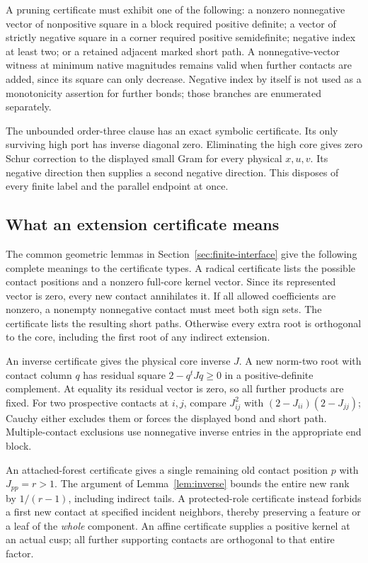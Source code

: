 \documentclass[11pt]{article}
\theoremstyle{remark}\newtheorem{remark}[theorem]{Remark}
\begin{document}
A pruning certificate must exhibit one of the following: a
nonzero nonnegative vector of nonpositive square in a block required
positive definite; a vector of strictly negative square in a corner
required positive semidefinite; negative index at least two; or a
retained adjacent marked short path. A nonnegative-vector witness
at minimum native magnitudes remains valid when further contacts
are added, since its square can only decrease. Negative index by
itself is not used as a monotonicity assertion for further bonds;
those branches are enumerated separately.

The unbounded order-three clause has an exact symbolic certificate.
Its only surviving high port has inverse diagonal zero. Eliminating
the high core gives zero Schur correction to the displayed small
Gram for every physical $x,u,v$. Its negative direction then supplies
a second negative direction. This disposes of every finite label
and the parallel endpoint at once.

\subsection{What an extension certificate means}

The common geometric lemmas in Section~\ref{sec:finite-interface}
give the following complete meanings to the certificate types.
A radical certificate lists the possible contact positions and a
nonzero full-core kernel vector. Since its represented vector is
zero, every new contact annihilates it. If all allowed coefficients
are nonzero, a nonempty nonnegative contact must meet both sign
sets. The certificate lists the resulting short paths. Otherwise
every extra root is orthogonal to the core, including the first
root of any indirect extension.

An inverse certificate gives the physical core inverse $J$.
A new norm-two root with contact column $q$ has residual square
$2-q^tJq\ge0$ in a positive-definite complement. At equality its
residual vector is zero, so all further products are fixed.
For two prospective contacts at $i,j$, compare $J_{ij}^2$ with
$(2-J_{ii})(2-J_{jj})$; Cauchy either excludes them or forces the
displayed bond and short path. Multiple-contact exclusions use
nonnegative inverse entries in the appropriate end block.

An attached-forest certificate gives a single remaining old contact
position $p$ with $J_{pp}=r>1$. The argument of
Lemma~\ref{lem:inverse} bounds the entire new rank by
$1/(r-1)$, including indirect tails. A protected-role certificate
instead forbids a first new contact at specified incident neighbors,
thereby preserving a feature or a leaf of the \emph{whole} component.
An affine certificate supplies a positive kernel at an actual cusp;
all further supporting contacts are orthogonal to that entire factor.
\end{document}
